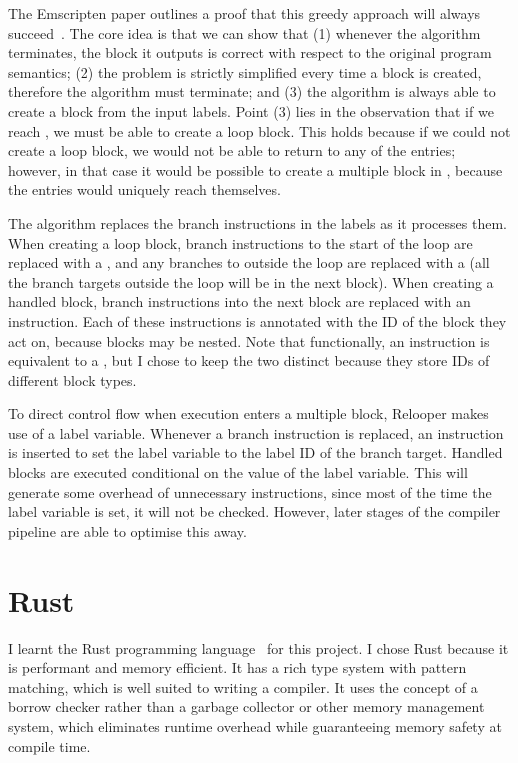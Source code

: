 \documentclass[00-main.tex]{subfiles}
\begin{document}
The Emscripten paper outlines a proof that this greedy approach will always succeed~.
The core idea is that we can show that (1) whenever the algorithm terminates, the block it outputs is correct with respect to the original program semantics; (2) the problem is strictly simplified every time a block is created, therefore the algorithm must terminate; and (3) the algorithm is always able to create a block from the input labels.
Point (3) lies in the observation that if we reach , we must be able to create a loop block.
This holds because if we could not create a loop block, we would not be able to return to any of the entries; however, in that case it would be possible to create a multiple block in , because the entries would uniquely reach themselves.

The algorithm replaces the branch instructions in the labels as it processes them.
When creating a loop block, branch instructions to the start of the loop are replaced with a , and any branches to outside the loop are replaced with a  (all the branch targets outside the loop will be in the next block).
When creating a handled block, branch instructions into the next block are replaced with an  instruction.
Each of these instructions is annotated with the ID of the block they act on, because blocks may be nested.
Note that functionally, an  instruction is equivalent to a , but I chose to keep the two distinct because they store IDs of different block types.

To direct control flow when execution enters a multiple block, Relooper makes use of a label variable.
Whenever a branch instruction is replaced, an instruction is inserted to set the label variable to the label ID of the branch target.
Handled blocks are executed conditional on the value of the label variable.
This will generate some overhead of unnecessary instructions, since most of the time the label variable is set, it will not be checked.
However, later stages of the compiler pipeline are able to optimise this away.


\section{Rust}\label{sec:prep:rust}

I learnt the Rust programming language~ for this project.
I chose Rust because it is performant and memory efficient.
It has a rich type system with pattern matching, which is well suited to writing a compiler.
It uses the concept of a borrow checker rather than a garbage collector or other memory management system, which eliminates runtime overhead while guaranteeing memory safety at compile time.
\end{document}

